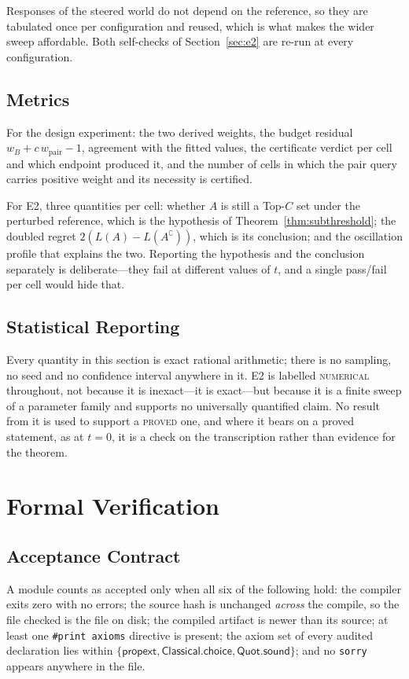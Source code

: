 \documentclass[conference]{IEEEtran}
\theoremstyle{definition}
\newcommand{\PROVED}{\textsc{proved}}
\newcommand{\NUM}{\textsc{numerical}}
\begin{document}
Responses of the steered world do not depend on the reference, so they are tabulated once per
configuration and reused, which is what makes the wider sweep affordable. Both self-checks of
Section~\ref{sec:e2} are re-run at every configuration.

\subsection{Metrics}

For the design experiment: the two derived weights, the budget residual
$w_{B}+c\,w_{\mathrm{pair}}-1$, agreement with the fitted values, the certificate verdict per
cell and which endpoint produced it, and the number of cells in which the pair query carries
positive weight and its necessity is certified.

For E2, three quantities per cell: whether $A$ is still a Top-$C$ set under the perturbed
reference, which is the hypothesis of Theorem~\ref{thm:subthreshold}; the doubled regret
$2(L(A)-L(A^{\complement}))$, which is its conclusion; and the oscillation profile that
explains the two. Reporting the hypothesis and the conclusion separately is deliberate---they
fail at different values of $t$, and a single pass/fail per cell would hide that.

\subsection{Statistical Reporting}

Every quantity in this section is exact rational arithmetic; there is no sampling, no seed and
no confidence interval anywhere in it. E2 is labelled \NUM{} throughout, not because it is
inexact---it is exact---but because it is a finite sweep of a parameter family and supports no
universally quantified claim. No result from it is used to support a \PROVED{} one, and where
it bears on a proved statement, as at $t=0$, it is a check on the transcription rather than
evidence for the theorem.

\section{Formal Verification}
\label{sec:verification}

\subsection{Acceptance Contract}

A module counts as accepted only when all six of the following hold: the compiler exits zero
with no errors; the source hash is unchanged \emph{across} the compile, so the file checked is
the file on disk; the compiled artifact is newer than its source; at least one
\texttt{\#print axioms} directive is present; the axiom set of every audited declaration lies
within $\{\textsf{propext},\textsf{Classical.choice},\textsf{Quot.sound}\}$; and no
\texttt{sorry} appears anywhere in the file.
\end{document}
